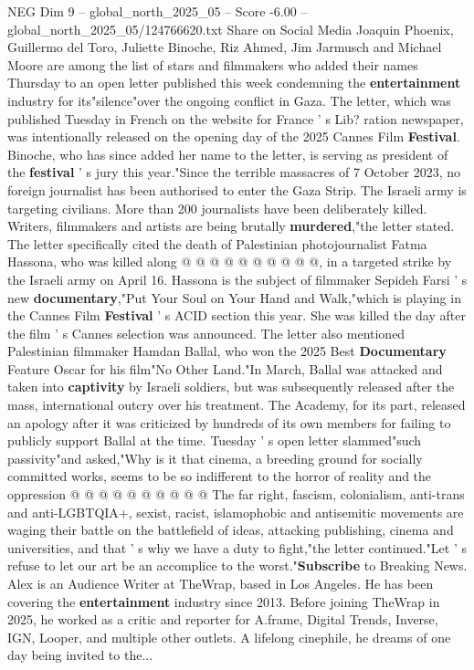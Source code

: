 \begin{textsample}{NEG Dim 9 – global\_north\_2025\_05 – Score -6.00 – global\_north\_2025\_05/124766620.txt}  \label{ex:f9_neg_177}
Share on Social Media Joaquin Phoenix, Guillermo del Toro, Juliette Binoche, Riz Ahmed, Jim Jarmusch and Michael Moore are among the list of stars and filmmakers who added their names Thursday to an open letter published this week condemning the \textbf{entertainment} industry for its"silence"over the ongoing conflict in Gaza.
The letter, which was published Tuesday in French on the website for France ' s Lib? ration newspaper, was intentionally released on the opening day of the 2025 Cannes Film \textbf{Festival}.
Binoche, who has since added her name to the letter, is serving as president of the \textbf{festival} ' s jury this year."Since the terrible massacres of 7 October 2023, no foreign journalist has been authorised to enter the Gaza Strip.
The Israeli army is targeting civilians.
More than 200 journalists have been deliberately killed.
Writers, filmmakers and artists are being brutally \textbf{murdered},"the letter stated.
The letter specifically cited the death of Palestinian photojournalist Fatma Hassona, who was killed along @ @ @ @ @ @ @ @ @ @, in a targeted strike by the Israeli army on April 16.
Hassona is the subject of filmmaker Sepideh Farsi ' s new \textbf{documentary},"Put Your Soul on Your Hand and Walk,"which is playing in the Cannes Film \textbf{Festival} ' s ACID section this year.
She was killed the day after the film ' s Cannes selection was announced.
The letter also mentioned Palestinian filmmaker Hamdan Ballal, who won the 2025 Best \textbf{Documentary} Feature Oscar for his film"No Other Land."In March, Ballal was attacked and taken into \textbf{captivity} by Israeli soldiers, but was subsequently released after the mass, international outcry over his treatment.
The Academy, for its part, released an apology after it was criticized by hundreds of its own members for failing to publicly support Ballal at the time.
Tuesday ' s open letter slammed"such passivity"and asked,"Why is it that cinema, a breeding ground for socially committed works, seems to be so indifferent to the horror of reality and the oppression @ @ @ @ @ @ @ @ @ @ The far right, fascism, colonialism, anti-trans and anti-LGBTQIA+, sexist, racist, islamophobic and antisemitic movements are waging their battle on the battlefield of ideas, attacking publishing, cinema and universities, and that ' s why we have a duty to fight,"the letter continued."Let ' s refuse to let our art be an accomplice to the worst."\textbf{Subscribe} to Breaking News.
Alex is an Audience Writer at TheWrap, based in Los Angeles.
He has been covering the \textbf{entertainment} industry since 2013.
Before joining TheWrap in 2025, he worked as a critic and reporter for A.frame, Digital Trends, Inverse, IGN, Looper, and multiple other outlets.
A lifelong cinephile, he dreams of one day being invited to the...

\end{textsample}
